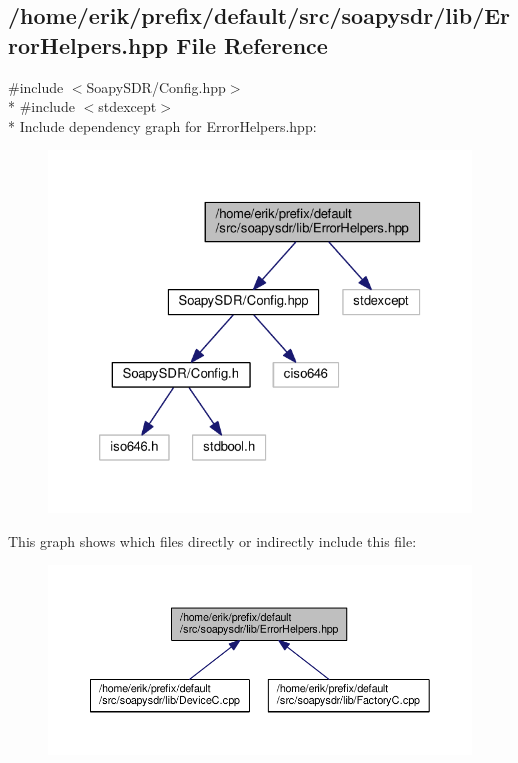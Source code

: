 \subsection{/home/erik/prefix/default/src/soapysdr/lib/\+Error\+Helpers.hpp File Reference}
\label{ErrorHelpers_8hpp}
{\ttfamily \#include $<$Soapy\+S\+D\+R/\+Config.\+hpp$>$}\\*
{\ttfamily \#include $<$stdexcept$>$}\\*
Include dependency graph for Error\+Helpers.\+hpp\+:
\nopagebreak
\begin{figure}[H]
\begin{center}
\leavevmode
\includegraphics[width=326pt]{df/dd4/ErrorHelpers_8hpp__incl}
\end{center}
\end{figure}
This graph shows which files directly or indirectly include this file\+:
\nopagebreak
\begin{figure}[H]
\begin{center}
\leavevmode
\includegraphics[width=350pt]{d1/d5c/ErrorHelpers_8hpp__dep__incl}
\end{center}
\end{figure}
